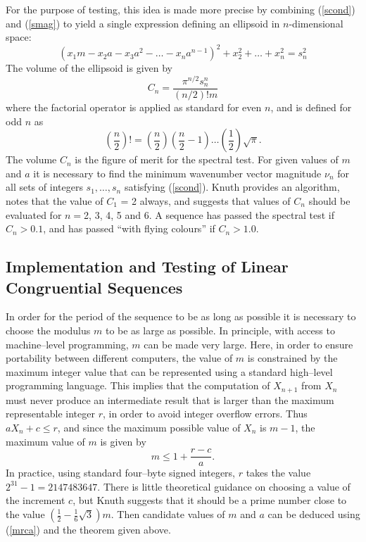 \documentclass[dvips]{article}
\begin{document}
For the purpose of testing, this idea is made more precise by combining
(\ref{scond}) and (\ref{smag})
to yield a single expression defining an ellipsoid in $n$-dimensional space:
\[
(x_{1}m-x_{2}a-x_{3}a^{2}-\dots -x_{n}a^{n-1})^{2} 
+x_{2}^{2}+\dots +x_{n}^{2} = s_{n}^{2}
\]
The volume of the ellipsoid is given by
\[
C_{n} = \frac{\pi^{n/2}s_{n}^{n}}{(n/2)!m}
\]
where the factorial operator is applied as standard for even $n$, and is
defined for odd $n$ as 
\[
\left(\frac{n}{2}\right)! =
\left(\frac{n}{2}\right)\left(\frac{n}{2}-1\right)\dots
\left(\frac{1}{2}\right)\sqrt{\pi}.
\]
The volume $C_{n}$ is the figure of merit for the spectral test.  For
given values of $m$ and $a$ it is necessary to find the minimum
wavenumber vector magnitude
$\nu_{n}$ for all sets of integers $s_{1},\ldots ,s_{n}$ satisfying
(\ref{scond}).  Knuth provides an algorithm, notes that the value of
$C_{1}$ = 2 always, and suggests that values of $C_{n}$ should be evaluated
for $n=$2, 3, 4, 5 and 6.  A sequence has passed the spectral test if
$C_{n}>0.1$, and has passed ``with flying colours'' if $C_{n}>1.0$.

\subsection*{Implementation and Testing of Linear Congruential
Sequences}
In order for the period of the sequence to be as long as possible it is
necessary to choose the modulus $m$ to be as large as possible.  In principle,
with access to machine--level programming, $m$ can be made very large.  Here, 
in order to ensure
portability between different computers, the value of $m$ is constrained by the 
maximum integer value that can be represented using a standard
high--level programming
language.  This implies that the computation of $X_{n+1}$ from $X_{n}$ must
never produce an intermediate result that is larger than the maximum
representable integer $r$, in order to avoid integer overflow errors.
Thus $aX_{n} + c \le r$, and since the maximum possible value of $X_{n}$
is $m-1$, the maximum value of $m$ is given by
\begin{equation}
m \le 1 + \frac{r-c}{a}.
\label{mrca}
\end{equation}
In practice, using standard four--byte signed integers, $r$ takes the
value $2^{31}-1 = 2147483647$.
There is little theoretical guidance on choosing a value of the
increment $c$, but Knuth suggests that it should be a prime number close
to the value $(\frac{1}{2}-\frac{1}{6}\sqrt{3})m$.  Then candidate values
of $m$ and $a$ can be deduced using (\ref{mrca}) and the theorem given above.
\end{document}
